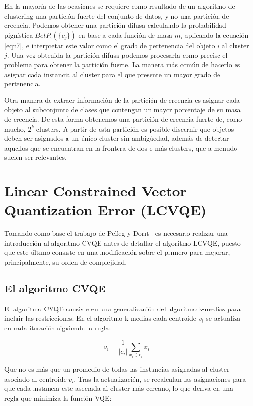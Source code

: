 En la mayoría de las ocasiones se requiere como resultado de un algoritmo de clustering una partición fuerte del conjunto de datos, y no una partición de creencia. Podemos obtener una partición difusa calculando la probabilidad pignística $BetP_i(\{c_j\})$ en base a cada función de masa $m_i$ aplicando la ecuación \ref{eqn7}, e interpretar este valor como el grado de pertenencia del objeto $i$ al cluster $j$. Una vez obtenida la partición difusa podemos procesarla como precise el problema para obtener la partición fuerte. La manera más común de hacerlo es asignar cada instancia al cluster para el que presente un mayor grado de pertenencia.

Otra manera de extraer información de la partición de creencia es asignar cada objeto al subconjunto de clases que contengan un mayor porcentaje de su masa de creencia. De esta forma obtenemos una partición de creencia fuerte de, como mucho, $2^k$ clusters. A partir de esta partición es posible discernir que objetos deben ser asignados a un único cluster sin ambigüedad, además de detectar aquellos que se encuentran en la frontera de dos o más clusters, que a menudo suelen ser relevantes.

\section{Linear Constrained Vector Quantization Error (LCVQE)}

Tomando como base el trabajo de Pelleg y Dorit \cite{LCVQE:2007}, es necesario realizar una introducción al algoritmo \acf{CVQE} antes de detallar el algoritmo \acs{LCVQE}, puesto que este último consiste en una modificación sobre el primero para mejorar, principalmente, su orden de complejidad.

\subsection{El algoritmo CVQE}

El algoritmo CVQE consiste en una generalización del algoritmo k-medias para incluir las restricciones. En el algoritmo k-medias cada centroide $v_i$ se actualiza en cada iteración siguiendo la regla:

\begin{equation}
v_i = \frac{1}{|c_i|} \sum_{x_i \in c_i} x_i
\label{eqn27}
\end{equation}

Que no es más que un promedio de todas las instancias asignadas al cluster asociado al centroide $v_i$. Tras la actualización, se recalculan las asignaciones para que cada instancia este asociada al cluster más cercano, lo que deriva en una regla que minimiza la función \acf{VQE}:

